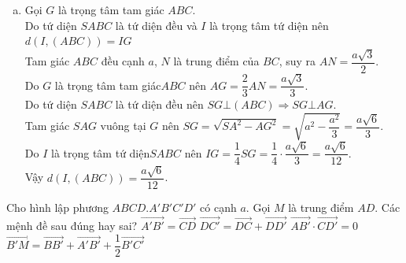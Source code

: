 \begin{ex}
\begin{ex}
{\begin{enumerate}[a)]
			Suy ra $\vec{SB}+\vec{SC}+\vec{AB}+\vec{AC}=2\left(\vec{SN}+\vec{AN}\right)$\\
			Do $M$ là trung điểm của $SA$ nên $\vec{NA}+\vec{NS}=2\vec{NM}\Leftrightarrow \vec{AN}+\vec{SN}=2\vec{MN}$.\\
			Do đó $\vec{SB}+\vec{SC}+\vec{AB}+\vec{AC}=2 \cdot 2 \cdot \vec{MN}=4\vec{MN}$.
			\item Gọi $G$ là trọng tâm tam giác $ABC$.\\
			Do tứ diện $SABC$ là tứ diện đều và $I$ là trọng tâm tứ diện nên $d\left(I,(ABC)\right)=IG$\\
			Tam giác $ABC$ đều cạnh $a$, $N$ là trung điểm của $BC$, suy ra $AN=\dfrac{a\sqrt{3}}{2}$.\\
			Do $G$ là trọng tâm tam giác$ABC$ nên $AG=\dfrac{2}{3}AN=\dfrac{a\sqrt{3}}{3}$.\\
			Do tứ diện $SABC$ là tứ diện đều nên $SG\bot (ABC)\Rightarrow SG\bot AG$.\\
			Tam giác $SAG$ vuông tại $G$ nên $SG=\sqrt{SA^2-AG^2}=\sqrt{a^2-\dfrac{a^2}{3}}=\dfrac{a\sqrt{6}}{3}$.\\
			Do $I$ là trọng tâm tứ diện$SABC$ nên $IG=\dfrac{1}{4}SG=\dfrac{1}{4} \cdot \dfrac{a\sqrt{6}}{3}=\dfrac{a\sqrt{6}}{12}$.\\
			Vậy $d\left(I,(ABC)\right)=\dfrac{a\sqrt{6}}{12}$.
		\end{enumerate}
	}
\end{ex}
\begin{ex}
	Cho hình lập phương $ABCD.A'B'C'D'$ có cạnh $a$. Gọi $M$ là trung điểm $AD$. Các mệnh đề sau đúng hay sai?
	\choiceTF
	{$\vec{A'B'}=\vec{CD}$}
	{\True $\vec{DC'}=\vec{DC}+\vec{DD'}$}
	{\True $\vec{AB'} \cdot \vec{CD'}=0$}
	{$\vec{B'M} =\vec{BB'}+\vec{A'B'
	}+\dfrac{1}{2}\vec{B'C'}$}
\end{ex}
\end{ex}
